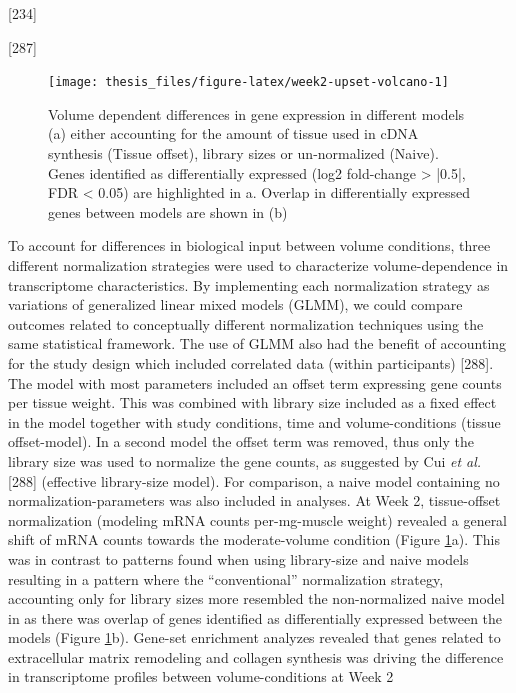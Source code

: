 \documentclass[twoside,10pt]{gihclass} %
\begin{document}
{[}234{]}

{[}287{]}
\begin{figure}

{\centering \texttt{[image: thesis\_files/figure-latex/week2-upset-volcano-1]} 

}

\caption[General patterns of differentially expressed genes at Week 2]{Volume dependent differences in gene expression in different models (a) either accounting for the amount of tissue used in cDNA synthesis (Tissue offset), library sizes or un-normalized (Naive). Genes identified as differentially expressed (log2 fold-change > |0.5|, FDR < 0.05) are highlighted in a.  Overlap in differentially expressed genes between models are shown in (b)}\label{fig:week2-upset-volcano}
\end{figure}
To account for differences in biological input between volume conditions, three different normalization strategies were used to characterize volume-dependence in transcriptome characteristics.
By implementing each normalization strategy as variations of generalized linear mixed models (GLMM), we could compare outcomes related to conceptually different normalization techniques using the same statistical framework.
The use of GLMM also had the benefit of accounting for the study design which included correlated data (within participants)
{[}288{]}.
The model with most parameters included an offset term expressing gene counts per tissue weight. This was combined with library size included as a fixed effect in the model together with study conditions, time and volume-conditions (tissue offset-model).
In a second model the offset term was removed, thus only the library size was used to normalize the gene counts, as suggested by Cui \emph{et al.}
{[}288{]} (effective library-size model).
For comparison, a naive model containing no normalization-parameters was also included in analyses.
At Week 2, tissue-offset normalization (modeling mRNA counts per-mg-muscle weight) revealed a general shift of mRNA counts towards the moderate-volume condition (Figure \ref{fig:week2-upset-volcano}a).
This was in contrast to patterns found when using library-size and naive models resulting in a pattern where the ``conventional'' normalization strategy, accounting only for library sizes more resembled the non-normalized naive model in as there was overlap of genes identified as differentially expressed between the models (Figure \ref{fig:week2-upset-volcano}b).
Gene-set enrichment analyzes revealed that genes related to extracellular matrix remodeling and collagen synthesis was driving the difference in transcriptome profiles between volume-conditions at Week 2
\end{document}
